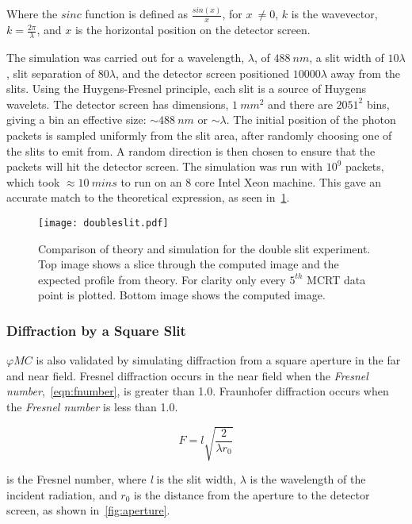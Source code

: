 Where the $sinc$ function is defined as $\tfrac{sin(x)}{x}$, for $x\ \neq 0$, $k$ is the wavevector, $k=\tfrac{2\pi}{\lambda}$, and $x$ is the horizontal position on the detector screen.

The simulation was carried out for a wavelength, $\lambda$,  of $488~nm$, a slit width of $10\lambda$, slit separation of $80\lambda$, and the detector screen positioned $10000\lambda$ away from the slits.
Using the Huygens-Fresnel principle, each slit is a source of Huygens wavelets.
The detector screen has dimensions, $1~mm^2$ and there are $2051^2$ bins, giving a bin an effective size: $\sim 488~nm$ or $\sim \lambda$.
The initial position of the photon packets is sampled uniformly from the slit area, after randomly choosing one of the slits to emit from.
A random direction is then chosen to ensure that the packets will hit the detector screen.
The simulation was run with $10^9$ packets, which took $\approx10~mins$ to run on an 8 core Intel Xeon machine.
This gave an accurate match to the theoretical expression, as seen in~\cref{fig:doubleslitcomp}.

\begin{figure}[!ht]
    \centering
    \texttt{[image: doubleslit.pdf]}
    \caption{Comparison of theory and simulation for the double slit experiment. Top image shows a slice through the computed image and the expected profile from theory. For clarity only every $5^{th}$ MCRT data point is plotted. Bottom image shows the computed image.}
    \label{fig:doubleslitcomp}
\end{figure}

\subsubsection*{Diffraction by a Square Slit}
$\varphi MC$ is also validated by simulating diffraction from a square aperture in the far and near field. 
Fresnel diffraction occurs in the near field when the \textit{Fresnel number},~\cref{eqn:fnumber}, is greater than 1.0.
Fraunhofer diffraction occurs when the \textit{Fresnel number} is less than 1.0.

\begin{equation}
F = l\sqrt{\frac{2}{\lambda r_0}}
\label{eqn:fnumber}
\end{equation}

 is the Fresnel number, where \textit{l} is the slit width, $\lambda$ is the wavelength of the incident radiation, and $r_0$ is the distance from the aperture to the detector screen, as shown in~\cref{fig:aperture}. 

